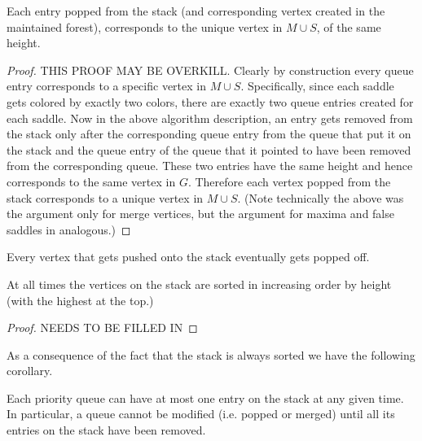 \documentclass[A4paper,11pt]{article}
\begin{document}
\begin{lemma}
 Each entry popped from the stack (and corresponding vertex created in the maintained forest), 
 corresponds to the unique vertex in $M\cup S$, of the same height.
\end{lemma}
\begin{proof}
THIS PROOF MAY BE OVERKILL.
 Clearly by construction every queue entry corresponds to a specific vertex in $M\cup S$.  Specifically, since each saddle gets colored by exactly two colors, there are exactly two queue entries created for each saddle.  Now in the above algorithm description, an entry gets removed from the stack only after the corresponding queue entry from the queue that put it on the stack and the queue entry of the queue that it pointed to have been removed from the corresponding queue.  These two entries have the same height and hence corresponds to the same vertex in $G$.  Therefore each vertex popped from the stack corresponds to a unique vertex in $M\cup S$.
 (Note technically the above was the argument only for merge vertices, but the argument for maxima and false saddles in analogous.) 
\end{proof}

\begin{lemma}
 \begin{compactenum}
  \item
 Every vertex that gets pushed onto the stack eventually gets popped off. 
\item
 At all times the vertices on the stack are sorted in increasing order by height (with the highest at the top.)
 \end{compactenum}
\end{lemma}
\begin{proof}
 NEEDS TO BE FILLED IN
\end{proof}


As a consequence of the fact that the stack is always sorted we have the following corollary.

\begin{corollary}
 Each priority queue can have at most one entry on the stack at any given time.  In particular, a queue cannot be modified (i.e. popped or merged) until all its entries on the stack have been removed.
\end{corollary}
\end{document}
